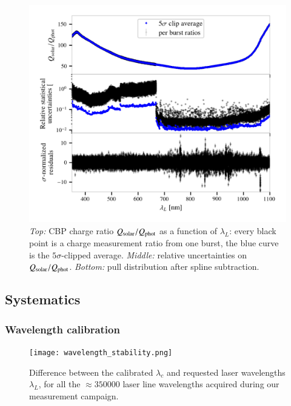 \begin{figure}[!h]
\centering
\includegraphics[width=\columnwidth]{fig/cbp_charge_ratio.png}
\caption{\textit{Top:} CBP charge ratio $Q_{\mathrm{solar}}/Q_{\mathrm{phot}}$ as a function of $\lambda_L$: every black point is a charge measurement ratio from one burst, the blue curve is the $5\sigma$-clipped average. \textit{Middle:} relative uncertainties on $Q_{\mathrm{solar}}/Q_{\mathrm{phot}}$. \textit{Bottom:} pull distribution after spline subtraction.}\label{fig:cbp_charge_ratio}
\end{figure}


\subsection{Systematics}



\subsubsection{Wavelength calibration}\label{sec:wavelength_syst}

\begin{figure}[!h]
\centering
\texttt{[image: wavelength\_stability.png]}
\caption{Difference between the calibrated $\lambda_c$ and requested laser wavelengths $\lambda_L$, for all the $\approx \num{350000}$ laser line wavelengths acquired during our measurement campaign.}\label{fig:wavelength_stability}
\end{figure}


